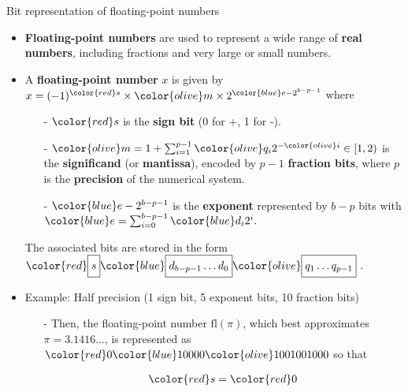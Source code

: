 \documentclass[t,usepdftitle=false]{beamer}
\begin{document}
\begin{frame}{Bit representation of floating-point numbers}
\begin{itemize}
\item \textbf{Floating-point numbers} are used to represent a wide range of \textbf{real numbers}, including fractions and very large or small numbers.\vspace{.07cm}
\item A \textbf{floating-point number} $x$ is given by $x = (-1)^{\color{red}s}\times {\color{olive}m}\times2^{{\color{blue}e}-2^{b-p-1}}$ where\vspace{.05cm}
\begin{itemize}
\item[-] ${\color{red}s}$ is the \textbf{sign bit} (0 for +, 1 for -).\vspace{.05cm}
\item[-] ${\color{olive}m}=1+\sum_{i=1}^{p-1}{\color{olive}q_i}2^{-{\color{olive}i}}\in[1,2)$ is the \textbf{significand} (or \textbf{mantissa}), encoded by $p-1$ \textbf{fraction bits}, where $p$ is the \textbf{precision} of the numerical system.\vspace{.05cm}
\item[-] ${\color{blue}e}-2^{b-p-1}$ is the \textbf{exponent} represented by $b-p$ bits with ${\color{blue}e}=\sum_{i=0}^{b-p-1}{\color{blue}d_{i}}2^i.\hspace{-1cm}$\vspace{.12cm}
\end{itemize}
The associated bits are stored in the form
$\color{red}\boxed{\vphantom{I^{I^o}_{p}}s}
\color{blue}\boxed{\vphantom{I^{I^o}_{p}}d_{b-p-1}\dots d_0}
\color{olive}\boxed{\vphantom{I^{I^o}_{p}}q_1\dots q_{p-1}}\,$.\vspace{.12cm}
\item Example: Half precision (1 sign bit, 5 exponent bits, 10 fraction bits)\vspace{.07cm}
\begin{itemize}
\item[-] Then, the floating-point number $\text{fl}(\pi)$, which best approximates $\pi=3.1416...$, is represented as
${\color{red}0}
{\color{blue}10000}
{\color{olive}1001001000}$ so that\vspace*{-.35cm}\\
\hspace{-1cm}\begin{minipage}{0.2\textwidth}
\begin{align*}
{\color{red}s}={\color{red}0}

\end{align*}
\end{minipage}
\end{itemize}
\end{itemize}
\end{frame}
\end{document}
